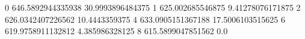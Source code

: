 0 646.5892944335938 30.9993896484375
1 625.002685546875 9.41278076171875
2 626.0342407226562 10.4443359375
4 633.0905151367188 17.5006103515625
6 619.9758911132812 4.385986328125
8 615.5899047851562 0.0
